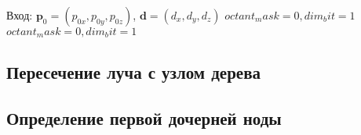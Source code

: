 \begin{algorithmic}
\STATE Вход: $\mathbf{p}_0 = (p_{0x}, p_{0y}, p_{0z})$, $\mathbf{d} = (d_{x}, d_{y}, d_{z})$
\STATE $octant_mask = 0, dim_bit = 1$
\STATE $octant_mask = 0, dim_bit = 1$
\ENDFOR
\end{algorithmic}

\subsection{Пересечение луча с узлом дерева}

\subsection{Определение первой дочерней ноды}
